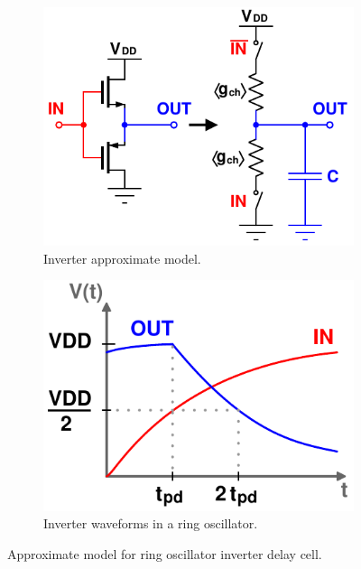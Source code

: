 		\begin{figure}[htb!]
	        \centering
	        \begin{subfigure}{.45\textwidth}
	            \centering
	            \includegraphics[width=\linewidth]{figs/design/inv_rc_model}
	            \caption{Inverter approximate model.}
	            \label{fig:inv_cir}
	        \end{subfigure}%
	        \begin{subfigure}{.5\textwidth}
	            \centering
	            \includegraphics[width=0.8\linewidth]{figs/design/inv_waves}
	            \caption{Inverter waveforms in a ring oscillator.}
	            \label{fig:inv_wave}
	        \end{subfigure}
	        \caption{Approximate model for ring oscillator inverter delay cell.}
	        \label{fig:inv_model}
	    \end{figure}

